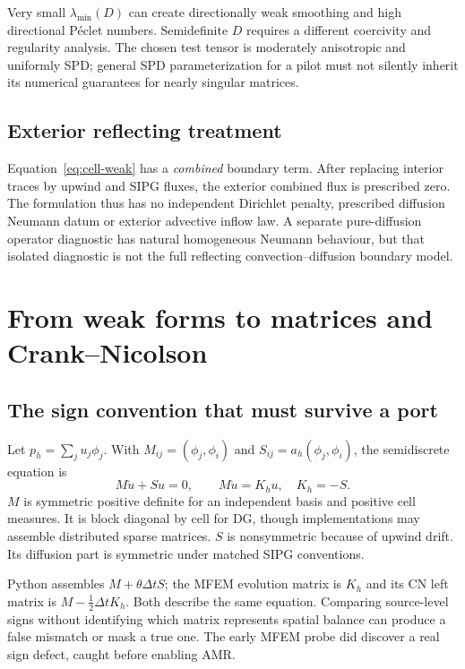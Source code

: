 Very small $\lambda_{\min}(D)$ can create directionally weak smoothing and high directional P\'eclet numbers. Semidefinite $D$ requires a different coercivity and regularity analysis. The chosen test tensor is moderately anisotropic and uniformly SPD; general SPD parameterization for a pilot must not silently inherit its numerical guarantees for nearly singular matrices.

\section{Exterior reflecting treatment}
Equation~\eqref{eq:cell-weak} has a \emph{combined} boundary term. After replacing interior traces by upwind and SIPG fluxes, the exterior combined flux is prescribed zero. The formulation thus has no independent Dirichlet penalty, prescribed diffusion Neumann datum or exterior advective inflow law. A separate pure-diffusion operator diagnostic has natural homogeneous Neumann behaviour, but that isolated diagnostic is not the full reflecting convection--diffusion boundary model.


\chapter{From weak forms to matrices and Crank--Nicolson}\label{ch:cn}
\section{The sign convention that must survive a port}
Let $p_h=\sum_ju_j\phi_j$. With $M_{ij}=(\phi_j,\phi_i)$ and $S_{ij}=a_h(\phi_j,\phi_i)$, the semidiscrete equation is
\begin{equation}\label{eq:semi}
M\dot u+Su=0,\qquad M\dot u=K_hu,\quad K_h=-S.
\end{equation}
$M$ is symmetric positive definite for an independent basis and positive cell measures. It is block diagonal by cell for DG, though implementations may assemble distributed sparse matrices. $S$ is nonsymmetric because of upwind drift. Its diffusion part is symmetric under matched SIPG conventions.

Python assembles $M+\theta\Delta tS$; the MFEM evolution matrix is $K_h$ and its CN left matrix is $M-\frac12\Delta tK_h$. Both describe the same equation. Comparing source-level signs without identifying which matrix represents spatial balance can produce a false mismatch or mask a true one. The early MFEM probe did discover a real sign defect, caught before enabling AMR.

